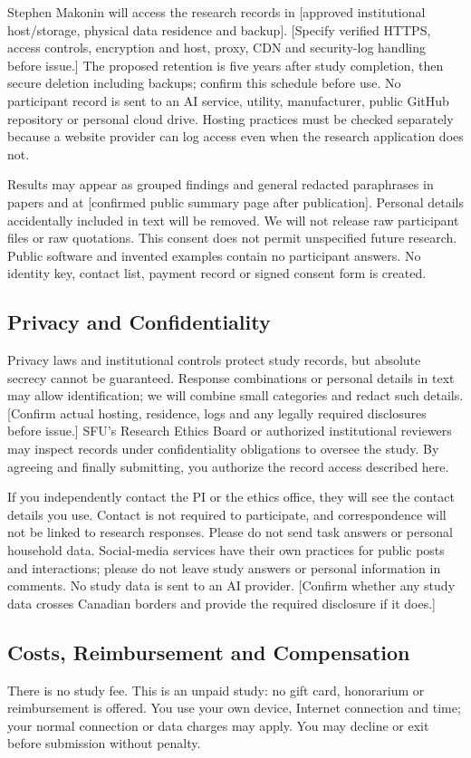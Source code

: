 \documentclass[11pt,letterpaper]{article}
\begin{document}
Stephen Makonin will access the research records in [approved institutional host/storage, physical data residence and backup]. [Specify verified HTTPS, access controls, encryption and host, proxy, CDN and security-log handling before issue.] The proposed retention is five years after study completion, then secure deletion including backups; confirm this schedule before use. No participant record is sent to an AI service, utility, manufacturer, public GitHub repository or personal cloud drive. Hosting practices must be checked separately because a website provider can log access even when the research application does not.

Results may appear as grouped findings and general redacted paraphrases in papers and at [confirmed public summary page after publication]. Personal details accidentally included in text will be removed. We will not release raw participant files or raw quotations. This consent does not permit unspecified future research. Public software and invented examples contain no participant answers. No identity key, contact list, payment record or signed consent form is created.

\subsection*{Privacy and Confidentiality}
Privacy laws and institutional controls protect study records, but absolute secrecy cannot be guaranteed. Response combinations or personal details in text may allow identification; we will combine small categories and redact such details. [Confirm actual hosting, residence, logs and any legally required disclosures before issue.] SFU's Research Ethics Board or authorized institutional reviewers may inspect records under confidentiality obligations to oversee the study. By agreeing and finally submitting, you authorize the record access described here.

If you independently contact the PI or the ethics office, they will see the contact details you use. Contact is not required to participate, and correspondence will not be linked to research responses. Please do not send task answers or personal household data. Social-media services have their own practices for public posts and interactions; please do not leave study answers or personal information in comments. No study data is sent to an AI provider. [Confirm whether any study data crosses Canadian borders and provide the required disclosure if it does.]

\subsection*{Costs, Reimbursement and Compensation}
There is no study fee. This is an unpaid study: no gift card, honorarium or reimbursement is offered. You use your own device, Internet connection and time; your normal connection or data charges may apply. You may decline or exit before submission without penalty.
\end{document}
